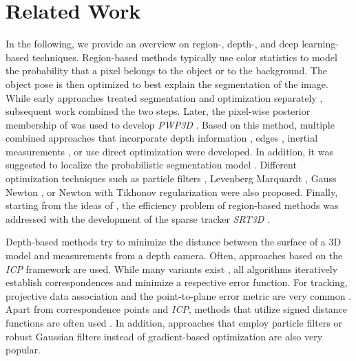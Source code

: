 \documentclass[10pt,twocolumn,letterpaper]{article}
\begin{document}
\section{Related Work}\label{sec:r}
In the following, we provide an overview on region-, depth-, and deep learning-based techniques.
Region-based methods typically use color statistics to model the probability that a pixel belongs to the object or to the background.
The object pose is then optimized to best explain the segmentation of the image.
While early approaches treated segmentation and optimization separately \cite{Schmaltz2012, Brox2010, Rosenhahn2007}, subsequent work \cite{Dambreville2008} combined the two steps.
Later, the pixel-wise posterior membership of \cite{Bibby2008} was used to develop \textit{PWP3D} \cite{Prisacariu2012}.
Based on this method, multiple combined approaches that incorporate depth information \cite{Ren2017, Kehl2017}, edges \cite{Sun2021, Li2021}, inertial measurements \cite{Prisacariu2015}, or use direct optimization \cite{Liu2020, Zhong2019, Liu2021} were developed.
In addition, it was suggested to localize the probabilistic segmentation model \cite{Hexner2016, Tjaden2018, Zhong2020}.
Different optimization techniques such as particle filters \cite{Zhao2014}, Levenberg Marquardt \cite{Prisacariu2015}, Gauss Newton \cite{Tjaden2018}, or Newton with Tikhonov regularization \cite{Stoiber2020b, Stoiber2021} were also proposed.
Finally, starting from the ideas of \cite{Kehl2017}, the efficiency problem of region-based methods was addressed with the development of the sparse tracker \textit{SRT3D} \cite{Stoiber2020b, Stoiber2021}.

Depth-based methods try to minimize the distance between the surface of a 3D model and measurements from a depth camera.
Often, approaches based on the \textit{\ac{ICP}} framework \cite{Chen1992, Besl1992} are used.
While many variants exist \cite{Rusinkiewicz2001, Pomerleau2015}, all algorithms iteratively establish correspondences and minimize a respective error function.
For tracking, projective data association \cite{Blais1995} and the point-to-plane error metric \cite{Chen1992} are very common \cite{Newcombe2011, Pauwels2014, Tan2017, Kehl2017}.
Apart from correspondence points and \textit{\ac{ICP}}, methods that utilize signed distance functions are often used \cite{Fitzgibbon2003, Ren2012, Schmidt2015, Ren2017}.
In addition, approaches that employ particle filters \cite{Wuethrich2013, Choi2013, Krull2015, Cifuentes2017} or robust Gaussian filters \cite{Issac2016} instead of gradient-based optimization are also very popular.
\end{document}
